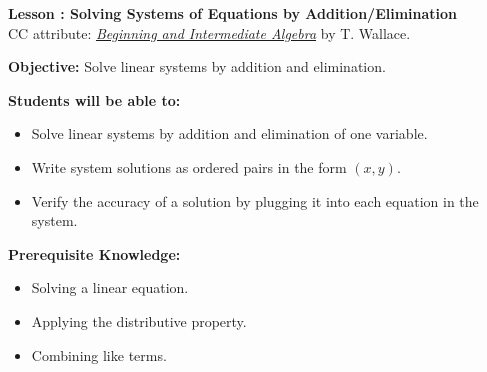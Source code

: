 \documentclass[12pt]{article}
\theoremstyle{definition}
\begin{document}
{\bf \large Lesson : Solving Systems of Equations by Addition/Elimination}\label{les:elimination}\\
CC attribute: \href{http://www.wallace.ccfaculty.org/book/book.html}{\it{Beginning and Intermediate Algebra}} by T. Wallace. \hfill \doclicenseImage[imagewidth=5em]\\
\par
{\bf Objective:} Solve linear systems by addition and elimination.\\
\par
{\bf Students will be able to:}
\begin{itemize}
	\item Solve linear systems by addition and elimination of one variable.
	\item Write system solutions as ordered pairs in the form $(x,y)$.
	\item Verify the accuracy of a solution by plugging it into each equation in the system.
\end{itemize}
{\bf Prerequisite Knowledge:}
\begin{itemize}
	\item Solving a linear equation.
	\item Applying the distributive property.
	\item Combining like terms.
\end{itemize}
\hrulefill
\end{document}
